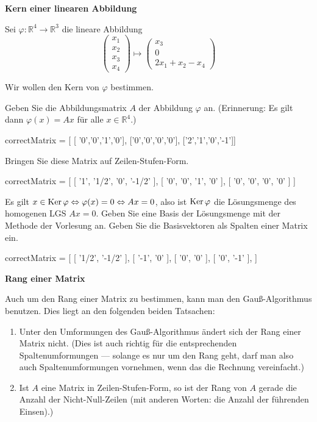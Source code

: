 \documentclass{ximera}
\begin{document}
\textbf{Kern einer linearen Abbildung}


Sei $\varphi\colon \mathbb R^4 \rightarrow \mathbb R^3$ die lineare Abbildung
\[
\left(
\begin{array}{c}
x_1 \\ x_2 \\ x_3 \\ x_4
\end{array}
\right)
\mapsto
\left(
\begin{array}{c}
x_3 \\ 0 \\ 2x_1 + x_2 - x_4
\end{array}
\right)
\]

\begin{question}
Wir wollen den Kern von $\varphi$ bestimmen.

\begin{solution}
Geben Sie die Abbildungsmatrix $A$ der Abbildung $\varphi$ an. (Erinnerung: Es gilt dann $\varphi(x) = Ax$ für alle $x\in \mathbb R^4$.)
\begin{matrix-answer}
correctMatrix = 
[ [ '0','0','1','0'], ['0','0','0','0'], ['2','1','0','-1']]
\end{matrix-answer}
\end{solution}

\begin{solution}
Bringen Sie diese Matrix auf Zeilen-Stufen-Form.
\begin{matrix-answer}
correctMatrix = [
[ '1', '1/2', '0', '-1/2' ], [ '0', '0', '1', '0' ], [ '0', '0', '0', '0' ]
]
\end{matrix-answer}
\end{solution}

\begin{solution}
Es gilt $x\in \mathop{\rm Ker}\varphi \Leftrightarrow \varphi(x) = 0 \Leftrightarrow Ax=0$, also ist $\mathop{\rm Ker}\varphi$ die Lösungsmenge des homogenen LGS $Ax=0$. Geben Sie eine Basis der Lösungsmenge mit der Methode der Vorlesung an. Geben Sie die Basisvektoren als Spalten einer Matrix ein.
\begin{matrix-answer}
correctMatrix = [
[  '1/2', '-1/2' ],
[  '-1', '0' ],
[  '0', '0' ],
[  '0', '-1' ],
] 
\end{matrix-answer}
\end{solution}
\end{question}


\textbf{Rang einer Matrix}

Auch um den Rang einer Matrix zu bestimmen, kann man den Gauß-Algorithmus benutzen. Dies liegt an den folgenden beiden Tatsachen:
\begin{enumerate}
\item
Unter den Umformungen des Gauß-Algorithmus ändert sich der Rang einer Matrix nicht. (Dies ist auch richtig für die entsprechenden Spaltenumformungen --- solange es nur um den Rang geht, darf man also auch Spaltenumformungen vornehmen, wenn das die Rechnung vereinfacht.)
\item
Ist $A$ eine Matrix in Zeilen-Stufen-Form, so ist der Rang von $A$ gerade die Anzahl der Nicht-Null-Zeilen (mit anderen Worten: die Anzahl der führenden Einsen).)
\end{enumerate}
\end{document}
